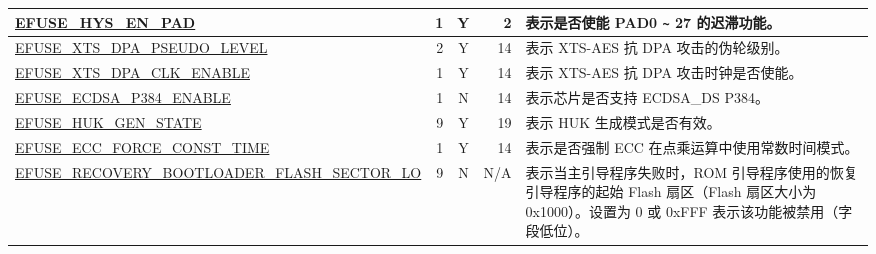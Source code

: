 \begin{longtable}[l]{ |m{8.5cm}|r|c|r|m{9.0cm}| }
    \hline
    \hyperref[fielddesc:EFUSEHYSENPAD]{EFUSE\_HYS\_EN\_PAD} & 1 & Y & 2 & 表示是否使能 PAD0 \verb+~+ 27 的迟滞功能。\\
    \hline
    \hyperref[fielddesc:EFUSEXTSDPAPSEUDOLEVEL]{EFUSE\_XTS\_DPA\_PSEUDO\_LEVEL} & 2 & Y & 14 & 表示 XTS-AES 抗 DPA 攻击的伪轮级别。\\
    \hline
    \hyperref[fielddesc:EFUSEXTSDPACLKENABLE]{EFUSE\_XTS\_DPA\_CLK\_ENABLE} & 1 & Y & 14 & 表示 XTS-AES 抗 DPA 攻击时钟是否使能。\\
    \hline
    \hyperref[fielddesc:EFUSEECDSAP384ENABLE]{EFUSE\_ECDSA\_P384\_ENABLE} & 1 & N & 14 & 表示芯片是否支持 ECDSA\_DS P384。 \\ \hline
    \hyperref[fielddesc:EFUSEHUKGENSTATE]{EFUSE\_HUK\_GEN\_STATE} & 9 & Y & 19 & 表示 HUK 生成模式是否有效。 \\ \hline
    \hline
    \hyperref[fielddesc:EFUSEECCFORCECONSTTIME]{EFUSE\_ECC\_FORCE\_CONST\_TIME} & 1 & Y & 14 & 表示是否强制 ECC 在点乘运算中使用常数时间模式。  \\ \hline
    \hyperref[fielddesc:EFUSERECOVERYBOOTLOADERFLASHSECTORLO]{EFUSE\_RECOVERY\_BOOTLOADER\_FLASH\_SECTOR\_LO} & 9 & N & N/A & 表示当主引导程序失败时，ROM 引导程序使用的恢复引导程序的起始 Flash 扇区（Flash 扇区大小为 0x1000）。设置为 0 或 0xFFF 表示该功能被禁用（字段低位）。\\ \hline
\end{longtable}
